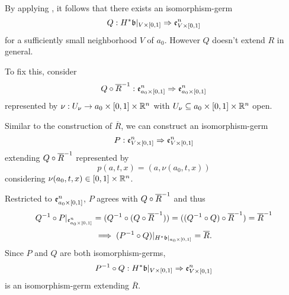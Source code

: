 \begin{myproof}
    By applying ,
    it follows that there exists an isomorphism-germ
    \[ Q: H^*\mathfrak{b}\vert_{V \times{} [0, 1]} \Rightarrow{} \mathfrak{e}^{n}_{V \times{} [0, 1]} \]
    for a sufficiently small neighborhood $V$ of $a_0$.
    However $Q$ doesn't extend $R$ in general.

    To fix this, consider
    \[ Q \circ \overline{R}^{-1}: \mathfrak{e}^{n}_{a_0 \times{} [0, 1]} \Rightarrow{} \mathfrak{e}^{n}_{a_0 \times{} [0, 1]} \]
    represented by $\nu: U_\nu \to a_0 \times{} [0, 1] \times \mathbb{R}^n$
    with $U_\nu \subseteq{} a_0 \times{} [0, 1] \times \mathbb{R}^n$ open.

    Similar to the construction of $\overline{R}$, we can construct an isomorphism-germ
    \[ P: \mathfrak{e}^{n}_{V \times{} [0, 1]} \Rightarrow{} \mathfrak{e}^{n}_{V \times{} [0, 1]} \]
    extending $Q \circ \overline{R}^{-1}$ represented by
    \[ p(a, t, x) = (a, \nu(a_0, t, x)) \]
    considering $\nu(a_0, t, x) \in [0, 1] \times \mathbb{R}^n$.

    Restricted to $\mathfrak{e}^{n}_{a_0 \times{} [0, 1]}$, $P$ agrees with $Q \circ \overline{R}^{-1}$ and thus
    \[
        Q^{-1} \circ P\vert_{\mathfrak{e}^{n}_{a_0 \times{} [0, 1]}}
        = (Q^{-1} \circ (Q \circ \overline{R}^{-1}))
        = ((Q^{-1} \circ Q) \circ \overline{R}^{-1})
        = \overline{R}^{-1}
    \]
    \[ \implies (P^{-1} \circ Q)\vert_{H^*\mathfrak{b}\vert_{a_0 \times{} [0, 1]}} = \overline{R}. \]
    Since $P$ and $Q$ are both isomorphism-germs,
    \[ P^{-1} \circ Q: H^*\mathfrak{b}\vert_{V \times{} [0, 1]} \Rightarrow{} \mathfrak{e}^{n}_{V \times{} [0, 1]} \]
    is an isomorphism-germ extending $\overline{R}$.
\end{myproof}

\begin{myproof}
\end{myproof}